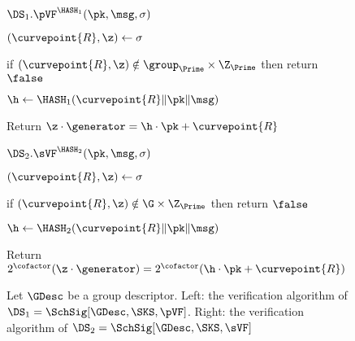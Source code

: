 	\begin{figure}
		{
			\begin{algorithm-initial}{$\DS_1.\pVF^{\HASH_1}(\pk, \msg, \sigma)$}
				\item $(\curvepoint{R}, \z) \gets \sigma$
				\item if $(\curvepoint{R}, \z) \notin \group_{\Prime} \times \Z_{\Prime}$ then return $\false$
				\item  $\h \gets \HASH_1(\curvepoint{R}\|\pk\| \msg)$
				\item Return $\z \cdot \generator = \h \cdot \pk + \curvepoint{R}$
			\end{algorithm-initial}  \vspace{2pt}
		}
		{
			\begin{algorithm-initial}{$\DS_2.\sVF^{\HASH_2}(\pk, \msg, \sigma)$}
				\item $(\curvepoint{R}, \z) \gets \sigma$
				\item if $(\curvepoint{R}, \z) \notin \G \times \Z_{\Prime}$ then return $\false$
				\item $\h \gets \HASH_2(\curvepoint{R}\|\pk\| \msg)$
				\item Return $2^\cofactor(\z \cdot  \generator)= 2^\cofactor(\h \cdot \pk + \curvepoint{R})$
			\end{algorithm-initial} 
		}
		\vspace{-8pt}
		\caption{Let $\GDesc$ be a group descriptor. Left: the verification algorithm of $\DS_1 = \SchSig[\GDesc,\SKS,\pVF]$. Right: the verification algorithm of $\DS_2 = \SchSig[\GDesc,\SKS,\sVF]$}
		\label{fig:sVF and pVF}
		\hrulefill
		\vspace{-10pt}
	\end{figure}
	
